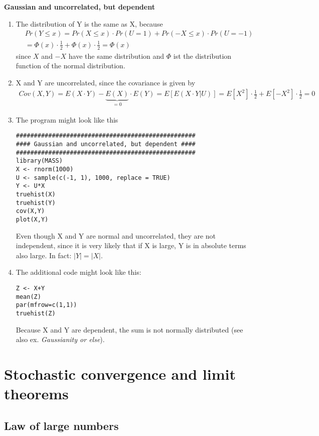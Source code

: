 \documentclass{article}
\begin{document}
\begin{solution}
\textbf{Gaussian and uncorrelated, but dependent}

\begin{enumerate}
  \item The distribution of Y is the same as X, because
  \begin{align*}
  &Pr(Y \leq x) = Pr(X\leq x)\cdot Pr(U=1) + Pr(-X\leq x)\cdot Pr(U=-1)\\
  &=\Phi(x) \cdot \frac{1}{2}+ \Phi(x) \cdot \frac{1}{2} = \Phi(x)
  \end{align*}
  since $X$ and $-X$ have the same distribution and $\Phi$ ist the
  distribution function of the normal distribution.
  \item X and Y are uncorrelated, since the covariance is given by
  \begin{align*}
  Cov(X,Y) = E(X\cdot Y) - \underbrace{E(X)}_{=0}\cdot E(Y) = E[E(X \cdot Y|U)] = E[X^2]\cdot \frac{1}{2} + E[-X^2]\cdot \frac{1}{2} = 0
  \end{align*}
  \item The program might look like this
\begin{verbatim}
##################################################
#### Gaussian and uncorrelated, but dependent ####
##################################################
library(MASS)
X <- rnorm(1000)
U <- sample(c(-1, 1), 1000, replace = TRUE)
Y <- U*X
truehist(X)
truehist(Y)
cov(X,Y)
plot(X,Y)
\end{verbatim}
Even though X and Y are normal and uncorrelated, they are not
independent, since it is very likely that if X is large, Y is in absolute
terms also large. In fact: $|Y|=|X|$.
\item The additional code might look like this:
\begin{verbatim}
Z <- X+Y
mean(Z)
par(mfrow=c(1,1))
truehist(Z)
\end{verbatim}
Because X and Y are dependent, the sum is not normally distributed (see
also ex. \emph{Gaussianity or else}).
\end{enumerate}

\end{solution}


\newpage
\section{Stochastic convergence and limit theorems\label{convergence}}

\subsection{Law of large numbers}
\end{document}
